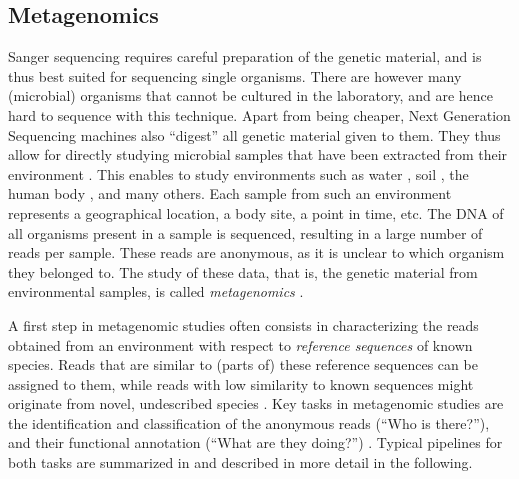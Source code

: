 \subsection{Metagenomics}
\label{ch:Foundations:sec:SequenceAnalysis:sub:Metagenomics}

Sanger sequencing requires careful preparation of the genetic material,
and is thus best suited for sequencing single organisms.
There are however many (microbial) organisms that cannot be cultured in the laboratory,
and are hence hard to sequence with this technique.
Apart from being cheaper, Next Generation Sequencing machines also ``digest'' all genetic material given to them.
They thus allow for directly studying microbial samples
that have been extracted from their environment \citep{Morgan2010,Edwards2013,Sunagawa2013a}.
This enables to study environments such as
water \cite{Karsenti2011,Giner2016,Gran-Stadniczenko2017},
soil \cite{Dupont2016,Mahe2017},
the human body \cite{Huttenhower2012,Methe2012,Matsen2015,Wang2015},
and many others.
Each sample from such an environment represents a geographical location, a body site, a point in time, etc.
The DNA of all organisms present in a sample is sequenced,
resulting in a large number of reads per sample.
These reads are anonymous, as it is unclear to which organism they belonged to.
The study of these data, that is, the genetic material from environmental samples,
is called \emph{metagenomics} \cite{Oulas2015}.


A first step in metagenomic studies often consists in characterizing the reads obtained from an environment
with respect to \emph{reference sequences} of known species.
Reads that are similar to (parts of) these reference sequences can be assigned to them,
while reads with low similarity to known sequences might originate from novel, undescribed species \cite{Temperton2012}.
Key tasks in metagenomic studies are the identification and classification of the anonymous reads (``Who is there?''),
and their functional annotation (``What are they doing?'') \cite{Desai2012,Lindgreen2016}.
Typical pipelines for both tasks are summarized in 
and described in more detail in the following.

